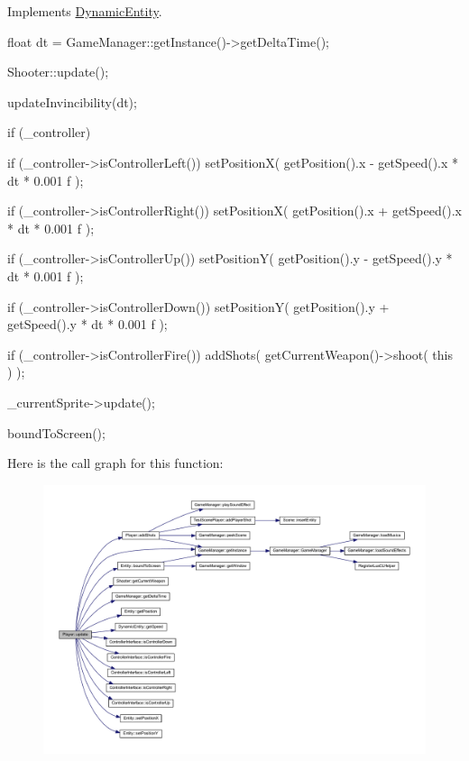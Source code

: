 Implements \hyperlink{class_dynamic_entity_a80ad0626e1c2167efa049c580c0d466c}{DynamicEntity}.


\begin{DoxyCode}
{
        float dt = GameManager::getInstance()->getDeltaTime();

        Shooter::update();

        updateInvincibility(dt);

        if (_controller)
        {
                if (_controller->isControllerLeft())
                {
                        setPositionX( getPosition().x - getSpeed().x * dt * 0.001
      f );
                }

                if (_controller->isControllerRight())
                {
                        setPositionX( getPosition().x + getSpeed().x * dt * 0.001
      f );
                }

                if (_controller->isControllerUp())
                {
                        setPositionY( getPosition().y - getSpeed().y * dt * 0.001
      f );
                }

                if (_controller->isControllerDown())
                {
                        setPositionY( getPosition().y + getSpeed().y * dt * 0.001
      f );
                }

                if (_controller->isControllerFire())
                {
                        addShots( getCurrentWeapon()->shoot( this ) );
                }
        }

        _currentSprite->update();

        boundToScreen();
}
\end{DoxyCode}


Here is the call graph for this function:
\nopagebreak
\begin{figure}[H]
\begin{center}
\leavevmode
\includegraphics[width=400pt]{d8/d53/class_player_a82c3476f3e65a4e2ac6bcd040771bdd4_cgraph}
\end{center}
\end{figure}




